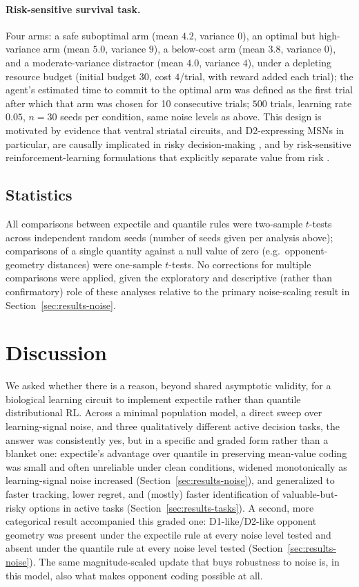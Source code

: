 \documentclass[11pt]{article}
\begin{document}
\paragraph{Risk-sensitive survival task.} Four arms: a safe suboptimal arm (mean $4.2$, variance $0$), an optimal but high-variance arm (mean $5.0$, variance $9$), a below-cost arm (mean $3.8$, variance $0$), and a moderate-variance distractor (mean $4.0$, variance $4$), under a depleting resource budget (initial budget $30$, cost $4$/trial, with reward added each trial); the agent's estimated time to commit to the optimal arm was defined as the first trial after which that arm was chosen for 10 consecutive trials; $500$ trials, learning rate $0.05$, $n=30$ seeds per condition, same noise levels as above. This design is motivated by evidence that ventral striatal circuits, and D2-expressing MSNs in particular, are causally implicated in risky decision-making \citep{costa2016,zalocusky2016}, and by risk-sensitive reinforcement-learning formulations that explicitly separate value from risk \citep{shen2014,tamar2015}.

\subsection{Statistics}
\label{sec:methods-stats}

All comparisons between expectile and quantile rules were two-sample $t$-tests across independent random seeds (number of seeds given per analysis above); comparisons of a single quantity against a null value of zero (e.g.\ opponent-geometry distances) were one-sample $t$-tests. No corrections for multiple comparisons were applied, given the exploratory and descriptive (rather than confirmatory) role of these analyses relative to the primary noise-scaling result in Section~\ref{sec:results-noise}.

\section{Discussion}
\label{sec:discussion}

We asked whether there is a reason, beyond shared asymptotic validity, for a biological learning circuit to implement expectile rather than quantile distributional RL. Across a minimal population model, a direct sweep over learning-signal noise, and three qualitatively different active decision tasks, the answer was consistently yes, but in a specific and graded form rather than a blanket one: expectile's advantage over quantile in preserving mean-value coding was small and often unreliable under clean conditions, widened monotonically as learning-signal noise increased (Section~\ref{sec:results-noise}), and generalized to faster tracking, lower regret, and (mostly) faster identification of valuable-but-risky options in active tasks (Section~\ref{sec:results-tasks}). A second, more categorical result accompanied this graded one: D1-like/D2-like opponent geometry was present under the expectile rule at every noise level tested and absent under the quantile rule at every noise level tested (Section~\ref{sec:results-noise}). The same magnitude-scaled update that buys robustness to noise is, in this model, also what makes opponent coding possible at all.
\end{document}
